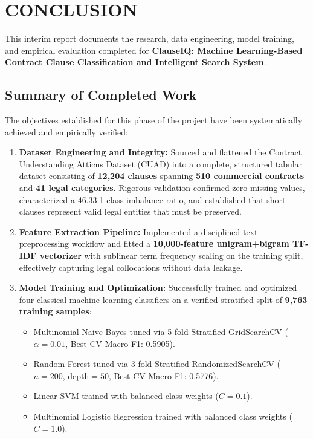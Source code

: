 \chapter{CONCLUSION}
\label{ch:conclusion}

This interim report documents the research, data engineering, model training, and empirical evaluation completed for \textbf{ClauseIQ: Machine Learning-Based Contract Clause Classification and Intelligent Search System}.

\section{Summary of Completed Work}
\label{sec:conclusion_summary}
The objectives established for this phase of the project have been systematically achieved and empirically verified:
\begin{enumerate}
    \item \textbf{Dataset Engineering and Integrity:} Sourced and flattened the Contract Understanding Atticus Dataset (CUAD) into a complete, structured tabular dataset consisting of \textbf{12,204 clauses} spanning \textbf{510 commercial contracts} and \textbf{41 legal categories}. Rigorous validation confirmed zero missing values, characterized a 46.33:1 class imbalance ratio, and established that short clauses represent valid legal entities that must be preserved.
    \item \textbf{Feature Extraction Pipeline:} Implemented a disciplined text preprocessing workflow and fitted a \textbf{10,000-feature unigram+bigram TF-IDF vectorizer} with sublinear term frequency scaling on the training split, effectively capturing legal collocations without data leakage.
    \item \textbf{Model Training and Optimization:} Successfully trained and optimized four classical machine learning classifiers on a verified stratified split of \textbf{9,763 training samples}:
    \begin{itemize}
        \item Multinomial Naive Bayes tuned via 5-fold Stratified GridSearchCV ($\alpha = 0.01$, Best CV Macro-F1: 0.5905).
        \item Random Forest tuned via 3-fold Stratified RandomizedSearchCV ($n=200$, depth$=50$, Best CV Macro-F1: 0.5776).
        \item Linear SVM trained with balanced class weights ($C = 0.1$).
        \item Multinomial Logistic Regression trained with balanced class weights ($C = 1.0$).

\end{itemize}
\end{enumerate}
